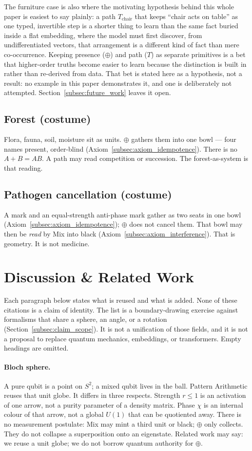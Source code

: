\documentclass[12pt, a4paper]{article}
\begin{document}
The furniture case is also where the motivating hypothesis behind
this whole paper is easiest to say plainly: a path $T_{\mathrm{chair}}$
that keeps ``chair acts on table'' as one typed, invertible step is a
shorter thing to learn than the same fact buried inside a flat
embedding, where the model must first discover, from undifferentiated
vectors, that arrangement is a different kind of fact than mere
co-occurrence. Keeping presence ($\oplus$) and path ($T$) as separate
primitives is a bet that higher-order truths become easier to learn
because the distinction is built in rather than re-derived from data.
That bet is stated here as a hypothesis, not a result: no example in
this paper demonstrates it, and one is deliberately not attempted.
Section~\ref{subsec:future_work} leaves it open.

\subsection{Forest (costume)}
Flora, fauna, soil, moisture sit as units. $\oplus$ gathers them into
one bowl --- four names present, order-blind
(Axiom~\ref{subsec:axiom_idempotence}).
There is no $A+B=AB$. A path may read competition or succession.
The forest-as-system is that reading.

\subsection{Pathogen cancellation (costume)}
A mark and an equal-strength anti-phase mark gather as two seats in
one bowl (Axiom~\ref{subsec:axiom_idempotence}); $\oplus$ does not
cancel them. That bowl may then be \emph{read} by Mix into black
(Axiom~\ref{subsec:axiom_interference}). That is geometry. It is not
medicine.

\section{Discussion \& Related Work}
\label{sec:related}

Each paragraph below states what is reused and what is added. None of
these citations is a claim of identity. The list is a
boundary-drawing exercise against formalisms that share a sphere, an
angle, or a rotation
(Section~\ref{subsec:claim_scope}). It is not a unification of those
fields, and it is not a proposal to replace quantum mechanics,
embeddings, or transformers. Empty headings are omitted.

\paragraph{Bloch sphere.}
A pure qubit is a point on $S^2$; a mixed qubit lives in the ball.
Pattern Arithmetic reuses that unit globe. It differs in three
respects. Strength $r\le 1$ is an activation of one arrow, not a purity
parameter of a density matrix. Phase $\chi$ is an internal colour of
that arrow, not a global $U(1)$ that can be quotiented away. There is
no measurement postulate: Mix may mint a third unit or black; $\oplus$
only collects. They do not collapse a superposition onto an eigenstate. Related work
may say: we reuse a unit globe; we do not borrow quantum authority for
$\oplus$.
\end{document}

